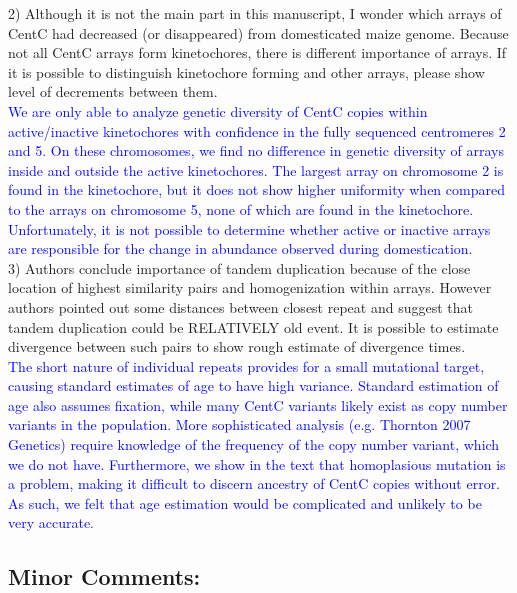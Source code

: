 \documentclass[]{article}
\newcommand{\res}[1]{\noindent \textcolor{blue}{{#1}} \\}
\begin{document}
2) Although it is not the main part in this manuscript, I wonder which arrays of CentC had decreased (or disappeared) from domesticated maize genome. Because not all CentC arrays form kinetochores, there is different importance of arrays. If it is possible to distinguish kinetochore forming and other arrays, please show level of decrements between them.\\

\res{We are only able to analyze genetic diversity of CentC copies within active/inactive kinetochores with confidence in the fully sequenced centromeres 2 and 5.  
On these chromosomes, we find no difference in genetic diversity of arrays inside and outside the active kinetochores.  
The largest array on chromosome 2 is found in the kinetochore, but it does not show higher uniformity when compared to the arrays on chromosome 5, none of which are found in the kinetochore.  
Unfortunately, it is not possible to determine whether active or inactive arrays are responsible for the change in abundance observed during domestication.}

3) Authors conclude importance of tandem duplication because of the close location of highest similarity pairs and homogenization within arrays. However authors pointed out some distances between closest repeat and suggest that tandem duplication could be RELATIVELY old event. It is possible to estimate divergence between such pairs to show rough estimate of divergence times.\\

\res{The short nature of individual repeats provides for a small mutational target, causing standard estimates of age to have high variance.  
Standard estimation of age also assumes fixation, while many CentC variants likely exist as copy number variants in the population. 
More sophisticated analysis (e.g. Thornton 2007 Genetics) require knowledge of the frequency of the copy number variant, which we do not have.
Furthermore, we show in the text that homoplasious mutation is a problem, making it difficult to discern ancestry of CentC copies without error.  
As such, we felt that age estimation would be complicated and unlikely to be very accurate.}

\subsection*{Minor Comments:}
\end{document}
